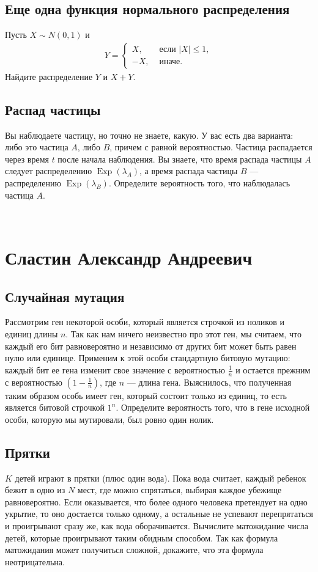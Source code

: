 \documentclass[12pt]{article}
\DeclareMathOperator{\Exp}{Exp}
\begin{document}
\subsection{Еще одна функция нормального распределения}
Пусть $X \sim N(0, 1)$ и 
\begin{align*}
    Y = \begin{cases}
        X, &\text{ если } |X| \le 1, \\
        -X, &\text{ иначе.}
    \end{cases}
\end{align*}
Найдите распределение $Y$ и $X + Y$.

\subsection{Распад частицы}
Вы наблюдаете частицу, но точно не знаете, какую. У вас есть два варианта: либо это частица $A$, либо $B$, причем с равной вероятностью. Частица распадается через время $t$ после начала наблюдения. Вы знаете, что время распада частицы $A$ следует распределению $\Exp(\lambda_A)$, а время распада частицы $B$ --- распределению $\Exp(\lambda_B)$. Определите вероятность того, что наблюдалась частица $A$.

\newpage
~
\newpage
\section{Сластин Александр Андреевич}

\subsection{Случайная мутация}
Рассмотрим ген некоторой особи, который является строчкой из ноликов и единиц длины $n$. Так как нам ничего неизвестно про этот ген, мы считаем, что каждый его бит равновероятно и независимо от других бит может быть равен нулю или единице. Применим к этой особи стандартную битовую мутацию: каждый бит ее гена изменит свое значение с вероятностью $\frac{1}{n}$ и остается прежним с вероятностью $(1 - \frac{1}{n})$, где $n$ --- длина гена. Выяснилось, что полученная таким образом особь имеет ген, который состоит только из единиц, то есть является битовой строчкой $1^n$. Определите вероятность того, что в гене исходной особи, которую мы мутировали, был ровно один нолик.

\subsection{Прятки}
$K$ детей играют в прятки (плюс один вода). Пока вода считает, каждый ребенок бежит в одно из $N$ мест, где можно спрятаться, выбирая каждое убежище равновероятно. Если оказывается, что более одного человека претендует на одно укрытие, то оно достается только одному, а остальные не успевают перепрятаться и проигрывают сразу же, как вода оборачивается. Вычислите матожидание числа детей, которые проигрывают таким обидным способом. Так как формула матожидания может получиться сложной, докажите, что эта формула неотрицательна.
\end{document}
